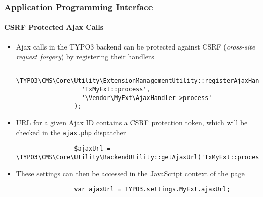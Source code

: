 
\begin{frame}[fragile]
	\frametitle{Application Programming Interface}
	\framesubtitle{CSRF Protected Ajax Calls}

	\lstset{
		basicstyle=\tiny\ttfamily
	}

	\begin{itemize}
		\item Ajax calls in the TYPO3 backend can be protected against CSRF (\textit{cross-site request forgery}) by registering their handlers

			\begin{lstlisting}
				\TYPO3\CMS\Core\Utility\ExtensionManagementUtility::registerAjaxHandler(
				  'TxMyExt::process',
				  '\Vendor\MyExt\AjaxHandler->process'
				);
			\end{lstlisting}

		\item URL for a given Ajax ID contains a CSRF protection token, which will be checked in the \texttt{ajax.php} dispatcher

			\begin{lstlisting}
				$ajaxUrl = \TYPO3\CMS\Core\Utility\BackendUtility::getAjaxUrl('TxMyExt::process');
			\end{lstlisting}

		\item These settings can then be accessed in the JavaScript context of the page

			\begin{lstlisting}
				var ajaxUrl = TYPO3.settings.MyExt.ajaxUrl;
			\end{lstlisting}

	\end{itemize}

\end{frame}


